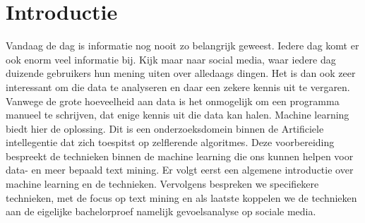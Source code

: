 \chapter{Introductie}\label{introductie}
Vandaag de dag is informatie nog nooit zo belangrijk geweest. Iedere dag komt er ook enorm veel informatie bij. Kijk maar naar social media, waar iedere dag duizende gebruikers hun mening uiten over alledaags dingen. Het is dan ook zeer interessant om die data te analyseren en daar een zekere kennis uit te vergaren. Vanwege de grote hoeveelheid aan data is het onmogelijk om een programma manueel te schrijven, dat enige kennis uit die data kan halen. Machine learning biedt hier de oplossing. Dit is een onderzoeksdomein binnen de Artificiele intellegentie dat zich toespitst op zelflerende algoritmes. Deze voorbereiding bespreekt de technieken binnen de machine learning die ons kunnen helpen voor data- en meer bepaald text mining. Er volgt eerst een algemene introductie over machine learning en de technieken. Vervolgens bespreken we specifiekere technieken, met de focus op text mining en als laatste koppelen we de technieken aan de eigelijke bachelorproef namelijk gevoelsanalyse op sociale media.
